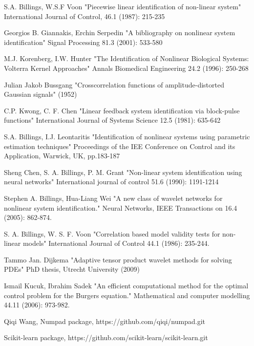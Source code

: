 \documentclass[a4paper,onecolumn]{article}
\theoremstyle{remark}
\begin{document}
\begin{thebibliography}{9}
S.A. Billings, W.S.F Voon
"Piecewise linear identification of non-linear system"
International Journal of Control, 46.1 (1987): 215-235

Georgios B. Giannakis, Erchin Serpedin
"A bibliography on nonlinear system identification"
Signal Processing 81.3 (2001): 533-580

M.J. Korenberg, I.W. Hunter
"The Identification of Nonlinear Biological Systems: Volterra Kernel Approaches"
Annals Biomedical Engineering 24.2 (1996): 250-268

Julian Jakob Bussgang
"Crosscorrelation functions of amplitude-distorted Gaussian signals" 
(1952)

C.P. Kwong, C. F. Chen
"Linear feedback system identification via block-pulse functions"
International Journal of Systems Science 12.5 (1981): 635-642

S.A. Billings, I.J. Leontaritis
"Identification of nonlinear systems using parametric estimation techniques"
Proceedings of the IEE Conference on Control and its Application, Warwick, UK, pp.183-187

Sheng Chen, S. A. Billings, P. M. Grant
"Non-linear system identification using neural networks" 
International journal of control 51.6 (1990): 1191-1214

Stephen A. Billings, Hua-Liang Wei
"A new class of wavelet networks for nonlinear system identification."
Neural Networks, IEEE Transactions on 16.4 (2005): 862-874.

S. A. Billings, W. S. F. Voon
"Correlation based model validity tests for non-linear models"
International Journal of Control 44.1 (1986): 235-244.

Tammo Jan. Dijkema
"Adaptive tensor product wavelet methods for solving PDEs"
PhD thesis, Utrecht University (2009)

Ismail Kucuk,  Ibrahim Sadek
"An efficient computational method for the optimal control problem for the Burgers equation." 
Mathematical and computer modelling 44.11 (2006): 973-982.

Qiqi Wang,
Numpad package,
https://github.com/qiqi/numpad.git

Scikit-learn package,
https://github.com/scikit-learn/scikit-learn.git


\end{thebibliography}
\end{document}
